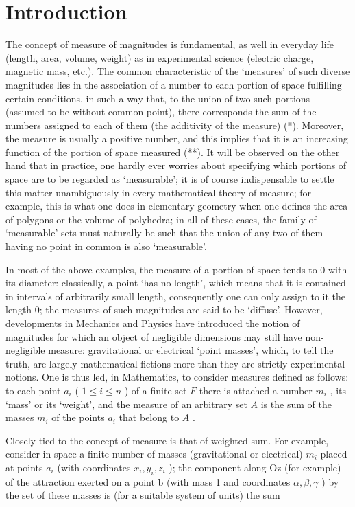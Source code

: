 \chapter*{Introduction}
{}

The concept of measure of magnitudes is fundamental, as well in everyday life (length, area, volume, weight) as in experimental science (electric charge, magnetic mass, etc.). The common characteristic of the `measures' of such diverse magnitudes lies in the association of a number to each portion of space fulfilling certain conditions, in such a way that, to the union of two such portions (assumed to be without common point), there corresponds the sum of the numbers assigned to each of them (the additivity of the measure) (*). Moreover, the measure is usually a positive number, and this implies that it is an increasing function of the portion of space measured (**). It will be observed on the other hand that in practice, one hardly ever worries about specifying which portions of space are to be regarded as `measurable'; it is of course indispensable to settle this matter unambiguously in every mathematical theory of measure; for example, this is what one does in elementary geometry when one defines the area of polygons or the volume of polyhedra; in all of these cases, the family of `measurable' sets must naturally be such that the union of any two of them having no point in common is also `measurable'.

In most of the above examples, the measure of a portion of space tends to 0 with its diameter: classically, a point `has no length', which means that it is contained in intervals of arbitrarily small length, consequently one can only assign to it the length 0; the measures of such magnitudes are said to be `diffuse'. However, developments in Mechanics and Physics have introduced the notion of magnitudes for which an object of negligible dimensions may still have non-negligible measure: gravitational or electrical `point masses', which, to tell the truth, are largely mathematical fictions more than they are strictly experimental notions. One is thus led, in Mathematics, to consider measures defined as follows: to each point \(a_i\) ( \(1 \leqslant i \leqslant n\) ) of a finite set \(F\) there is attached a number \(m_i\) , its `mass' or its `weight', and the measure of an arbitrary set \(A\) is the sum of the masses \(m_i\) of the points \(a_i\) that belong to \(A\) .

Closely tied to the concept of measure is that of weighted sum. For example, consider in space a finite number of masses (gravitational or electrical) \(m_{i}\) placed at points \(a_{i}\) (with coordinates \(x_{i}, y_{i}, z_{i}\) ); the component along Oz (for example) of the attraction exerted on a point b (with mass 1 and coordinates \(\alpha, \beta, \gamma\) ) by the set of these masses is (for a suitable system of units) the sum

